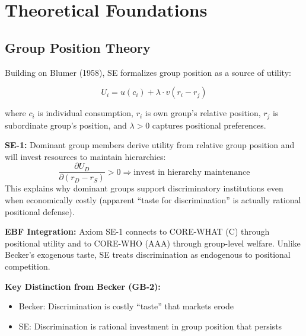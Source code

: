 \section{Theoretical Foundations}
\label{sec:se-theory}

\subsection{Group Position Theory}
\label{subsec:se-group-position}

Building on Blumer (1958), SE formalizes group position as a source of utility:

\begin{equation}
U_i = u(c_i) + \lambda \cdot v(r_i - r_j)
\label{eq:se-position}
\end{equation}

where $c_i$ is individual consumption, $r_i$ is own group's relative position, $r_j$ is subordinate group's position, and $\lambda > 0$ captures positional preferences.

\begin{axiom}
\label{ax:se-1}
\textbf{SE-1:} Dominant group members derive utility from relative group position and will invest resources to maintain hierarchies:
\begin{equation}
\frac{\partial U_D}{\partial (r_D - r_S)} > 0 \Rightarrow \text{invest in hierarchy maintenance}
\end{equation}
This explains why dominant groups support discriminatory institutions even when economically costly (apparent ``taste for discrimination'' is actually rational positional defense).
\end{axiom}

\textbf{EBF Integration:} Axiom SE-1 connects to CORE-WHAT (C) through positional utility and to CORE-WHO (AAA) through group-level welfare. Unlike Becker's exogenous taste, SE treats discrimination as endogenous to positional competition.

\textbf{Key Distinction from Becker (GB-2):}
\begin{itemize}
    \item Becker: Discrimination is costly ``taste'' that markets erode
    \item SE: Discrimination is rational investment in group position that persists
\end{itemize}

